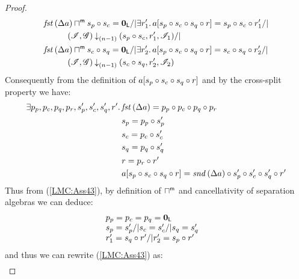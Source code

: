 \begin{lemma}
\begin{proof}
\begin{align}
%  
  &\fst{\updateFP{a}} \maxMeetL s_p \composeL s_c = \unitL /| \exsts{r'_1}a[s_p \composeL s_c \composeL s_q \composeL r] = s_p \composeL s_c \composeL r'_1 /| \nonumber\\
  &\hspace{1cm}\extendsAMUptob{\lmod, \gmod}{(n-1)}{s_p \composeL s_c, r'_1}{\lmod_{1}} /| \nonumber\\
  &\fst{\updateFP{a}} \maxMeetL s_c \composeL s_q = \unitL /| \exsts{r'_2}a[s_p \composeL s_c \composeL s_q \composeL r] = s_c \composeL s_q \composeL r'_2 /| \nonumber\\
  &\hspace{1cm}\extendsAMUptob{\lmod, \gmod}{(n-1)}{s_c \composeL s_q, r'_2}{\lmod_{2}} \label{LMC:Ass43}
\end{align}
Consequently from the definition of $a[s_p \circ s_c \circ s_q \circ r]$ and by the cross-split property we have:
%
\begin{align*}
	\exists p_p, p_c, p_q, p_r, s_p', s_c', s_q', r'.\, & \mathit{fst}\left(\Delta {a}\right) = p_p \circ p_c \circ p_q \circ p_r \\
	& s_p = p_p \circ s_p' \\
	& s_c = p_c \circ s_c' \\
	& s_q = p_q \circ s_q' \\
	& r = p_r \circ r' \\
	& a[s_p \circ s_c \circ s_q \circ r] = \mathit{snd}\left(\Delta {a}\right) \circ s_p' \circ s_c' \circ s_q' \circ r'
\end{align*}
%
Thus from (\ref{LMC:Ass43}), by definition of $\sqcap_{}^{\textsf{m}}$ and cancellativity of separation algebras we can deduce:
%
\begin{align*}
	&\begin{array}{l}
		p_p = p_c = p_q = \mathbf{0}_{\textsf{L}} \\
		s_p = s_p' /| s_c = s_c' /| s_q = s_q' \\
		r'_1 = s_q \circ r' /| r'_2 = s_p \circ r'
	\end{array}
\end{align*}
and thus we can rewrite (\ref{LMC:Ass43}) as:
%
\begin{align*}

\end{align*}
\end{proof}
\end{lemma}
